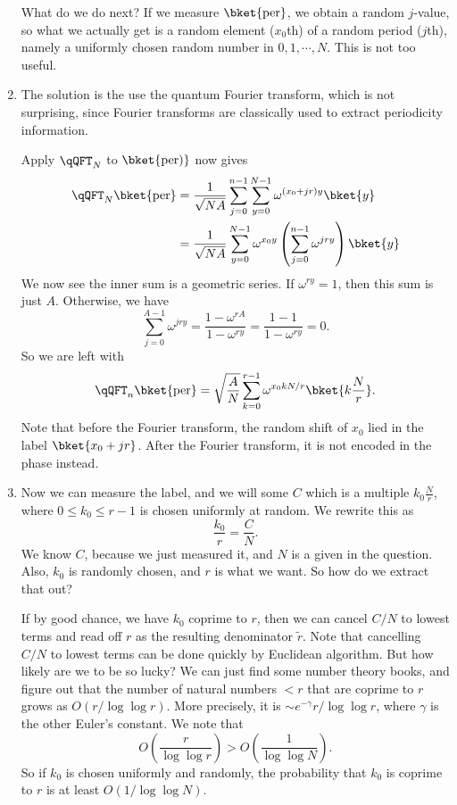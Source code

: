 \documentclass[a4paper]{article}
\begin{document}
\begin{eg}
\begin{enumerate}
      What do we do next? If we measure $\bket{\mathrm{per}}$, we obtain a random $j$-value, so what we actually get is a random element ($x_0$th) of a random period ($j$th), namely a uniformly chosen random number in $0, 1, \cdots, N$. This is not too useful.

    \item The solution is the use the quantum Fourier transform, which is not surprising, since Fourier transforms are classically used to extract periodicity information.

      Apply $\qQFT_N$ to $\bket{\mathrm{per})}$ now gives
      \begin{align*}
        \qQFT_N \bket{\mathrm{per}} &= \frac{1}{\sqrt{NA}} \sum_{j = 0}^{n - 1} \sum_{y = 0}^{N - 1} \omega^{(x_0 + jr) y} \bket{y}\\
        &= \frac{1}{\sqrt{NA}} \sum_{y = 0}^{N - 1} \omega^{x_0 y}\left(\sum_{j = 0}^{n - 1}\omega^{jry}\right) \bket{y}
      \end{align*}
      We now see the inner sum is a geometric series. If $\omega^{ry} = 1$, then this sum is just $A$. Otherwise, we have
      \[
        \sum_{j = 0}^{A - 1} \omega^{jry} = \frac{1 - \omega^{rA}}{1 - \omega^{ry}} = \frac{1 - 1}{1 - \omega^{ry}} = 0.
      \]
      So we are left with
      \[
        \qQFT_n \bket{\mathrm{per}} = \sqrt{\frac{A}{N}} \sum_{k = 0}^{r - 1}\omega ^{x_0 k N/r} \bket{k\frac{N}{r}}.
      \]
      Note that before the Fourier transform, the random shift of $x_0$ lied in the label $\bket{x_0 + jr}$. After the Fourier transform, it is not encoded in the phase instead.

    \item Now we can measure the label, and we will some $C$ which is a multiple $k_0 \frac{N}{r}$, where $0 \leq k_0 \leq r - 1$ is chosen uniformly at random. We rewrite this as
      \[
        \frac{k_0}{r} = \frac{C}{N}.
      \]
      We know $C$, because we just measured it, and $N$ is a given in the question. Also, $k_0$ is randomly chosen, and $r$ is what we want. So how do we extract that out?

      If by good chance, we have $k_0$ coprime to $r$, then we can cancel $C/N$ to lowest terms and read off $r$ as the resulting denominator $\tilde{r}$. Note that cancelling $C/N$ to lowest terms can be done quickly by Euclidean algorithm. But how likely are we to be so lucky? We can just find some number theory books, and figure out that the number of natural numbers $< r$ that are coprime to $r$ grows as $O(r/\log \log r)$. More precisely, it is $\sim e^{-\gamma} r/\log \log r$, where $\gamma$ is the other Euler's constant. We note that
      \[
        O\left(\frac{r}{\log \log r}\right) > O\left(\frac{1}{\log \log N}\right).
      \]
      So if $k_0$ is chosen uniformly and randomly, the probability that $k_0$ is coprime to $r$ is at least $O(1/\log \log N)$.


\end{enumerate}
\end{eg}
\end{document}
